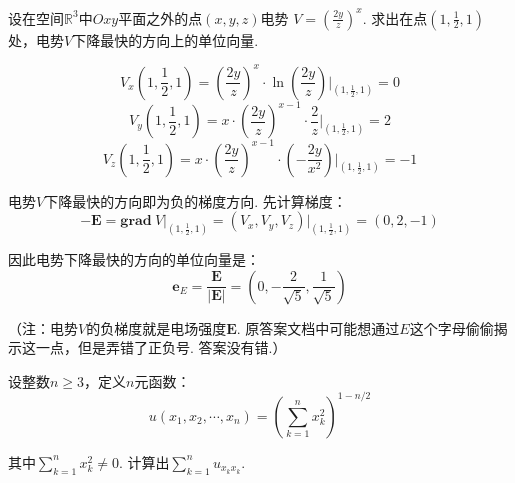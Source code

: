 \begin{example}[2020]
\label{ex:ch06-12}
设在空间$\mathbb{R}^3$中$Oxy$平面之外的点$(x,y,z)$电势
$V = \left( \frac{2y}{z} \right)^x$.
求出在点$(1,\frac{1}{2},1)$处，电势$V$下降最快的方向上的单位向量.
\end{example}

\begin{solution}
$$
V_{x}(1,\frac{1}{2},1) = \left( \frac{2y}{z}\right)^{x} \cdot \ln \left(\frac{2y}{z} \right) \bigg|_{(1,\frac{1}{2},1)} = 0
$$
$$
V_{y}(1,\frac{1}{2},1) = x \cdot \left( \frac{2y}{z}\right)^{x-1} \cdot \frac{2}{z} \bigg|_{(1,\frac{1}{2},1)} = 2
$$
$$
V_{z}(1,\frac{1}{2},1) = x \cdot \left( \frac{2y}{z}\right)^{x-1} \cdot \left( -\frac{2y}{x^2} \right) \bigg|_{(1,\frac{1}{2},1)} = -1
$$

电势$V$下降最快的方向即为负的梯度方向. 先计算梯度：
$$
\bm{-E} =
\mathbf{grad}~V \bigg|_{(1,\frac{1}{2},1)}
= (V_x,V_y,V_z) \bigg|_{(1,\frac{1}{2},1)}
= (0,2,-1)
$$

因此电势下降最快的方向的单位向量是：
$$
\bm{e}_{E} = \frac{\bm{E}}{|\bm{E}|} = \left( 0,-\frac{2}{\sqrt{5}},\frac{1}{\sqrt{5}} \right)
$$

（注：电势$V$的负梯度就是电场强度$\bm{E}$.
原答案文档中可能想通过$E$这个字母偷偷揭示这一点，但是弄错了正负号. 答案没有错.）
\end{solution}

\begin{example}[2022 B卷]
\label{ex:ch06-13}
设整数$n \ge 3$，定义$n$元函数：
$$
u(x_1,x_2, \cdots ,x_n) = \left( \sum_{k=1}^{n} x_{k}^{2} \right)^{1-n/2}
$$

其中$\sum_{k=1}^{n} x_{k}^{2} \ne 0$.
计算出$\sum_{k=1}^{n} u_{x_k x_k}$.
\end{example}

